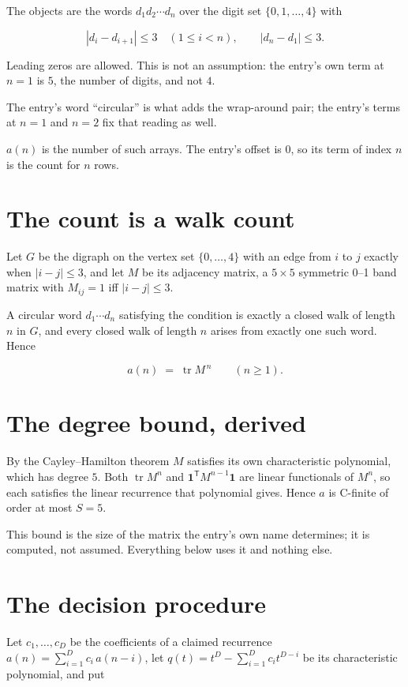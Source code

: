 \documentclass[11pt]{article}
\theoremstyle{definition}
\begin{document}
The objects are the words $d_1 d_2 \cdots d_n$ over the digit set $\{0,1,\dots,4\}$ with

\[|d_i - d_{i+1}| \le 3\quad (1 \le i < n), \qquad |d_n - d_1| \le 3.\]

Leading zeros are allowed. This is not an assumption: the entry's own term at $n=1$ is $5$, the number of digits, and not $4$.

The entry's word ``circular'' is what adds the wrap-around pair; the entry's terms at $n = 1$ and $n = 2$ fix that reading as well.

$a(n)$ is the number of such arrays. The entry's offset is 0, so its term of index $n$ is the count for $n$ rows.

\section{The count is a walk count}

Let $G$ be the digraph on the vertex set $\{0,\dots,4\}$ with an edge from $i$ to $j$ exactly when $|i-j| \le 3$, and let $M$ be its adjacency matrix, a $5 \times 5$ symmetric 0--1 band matrix with $M_{ij} = 1$ iff $|i-j| \le 3$.

A circular word $d_1\cdots d_n$ satisfying the condition is exactly a closed walk of length $n$ in $G$, and every closed walk of length $n$ arises from exactly one such word. Hence

\[a(n) \;=\; \operatorname{tr} M^{\,n} \qquad (n \ge 1).\]

\section{The degree bound, derived}

By the Cayley--Hamilton theorem $M$ satisfies its own characteristic polynomial, which has degree $5$. Both $\operatorname{tr} M^n$ and $\mathbf 1^{\mathsf T} M^{n-1} \mathbf 1$ are linear functionals of $M^{n}$, so each satisfies the linear recurrence that polynomial gives. Hence $a$ is C-finite of order at most $S = 5$.

This bound is the size of the matrix the entry's own name determines; it is computed, not assumed. Everything below uses it and nothing else.

\section{The decision procedure}

Let $c_1,\dots,c_D$ be the coefficients of a claimed recurrence $a(n) = \sum_{i=1}^{D} c_i\,a(n-i)$, let $q(t) = t^{D} - \sum_{i=1}^{D} c_i t^{D-i}$ be its characteristic polynomial, and put
\end{document}
